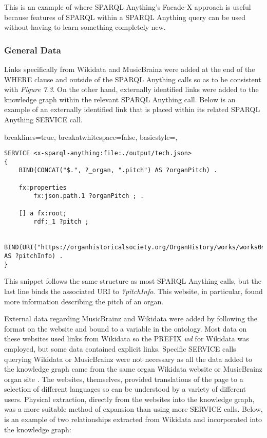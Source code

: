 This is an example of where SPARQL Anything's Facade-X approach is useful because features of SPARQL within a SPARQL Anything query can be used without having to learn something completely new. 

\subsubsection{General Data}
\hspace*{0.5cm} Links specifically from Wikidata and MusicBrainz were added at the end of the WHERE clause and outside of the SPARQL Anything calls so as to be consistent with \textit{Figure 7.3}. On the other hand, externally identified links were added to the knowledge graph within the relevant SPARQL Anything call. Below is an example of an externally identified link that is placed within its related SPARQL Anything SERVICE call.

\lstset
{
    breaklines=true,
    breakatwhitespace=false,
    basicstyle=\linespread{1.25}\ttfamily,
}
\begin{lstlisting}
SERVICE <x-sparql-anything:file:./output/tech.json>
{
    BIND(CONCAT("$.", ?_organ, ".pitch") AS ?organPitch) .

    fx:properties
        fx:json.path.1 ?organPitch ; .

    [] a fx:root; 
        rdf:_1 ?pitch ;
    
    BIND(URI("https://organhistoricalsociety.org/OrganHistory/works/works04.htm") AS ?pitchInfo) .
} 
\end{lstlisting}

This snippet follows the same structure as most SPARQL Anything calls, but the last line binds the associated URI to \textit{?pitchInfo}. This website, in particular, found more information describing the pitch of an organ. 

External data regarding MusicBrainz and Wikidata were added by following the format on the website and bound to a variable in the ontology. Most data on these websites used links from Wikidata so the PREFIX \textit{wd} for Wikidata was employed, but some data contained explicit links. Specific SERVICE calls querying Wikidata or MusicBrainz were not necessary as all the data added to the knowledge graph came from the same organ Wikidata website \cite{organwikidata} or MusicBrainz organ site \cite{organmusicbrainz}. The websites, themselves, provided translations of the page to a selection of different languages so can be understood by a variety of different users. Physical extraction, directly from the websites into the knowledge graph, was a more suitable method of expansion than using more SERVICE calls. Below, is an example of two relationships extracted from Wikidata and incorporated into the knowledge graph:

